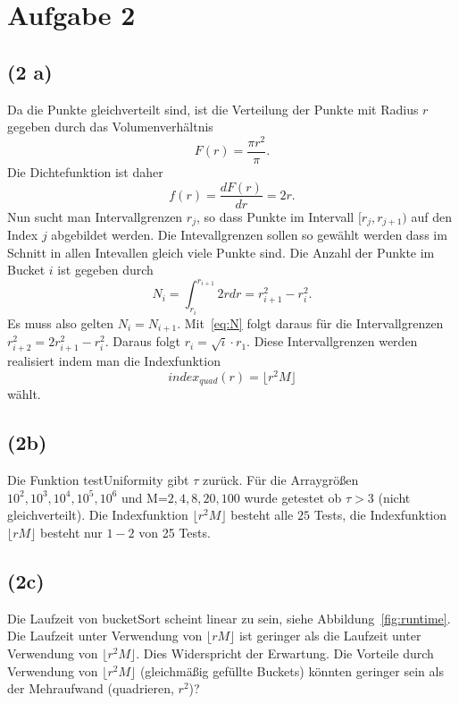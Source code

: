 \documentclass[a4paper]{article}
\begin{document}
\section*{Aufgabe 2}
\subsection*{(2 a)}
Da die Punkte gleichverteilt sind, ist die Verteilung der Punkte mit Radius $r$ gegeben durch das Volumenverhältnis 
\begin{equation}
F(r)=\frac{\pi r^2}{\pi}.
\end{equation}
Die Dichtefunktion ist daher
\begin{equation}
f(r)=\frac{dF(r)}{dr}=2r.
\end{equation}
Nun sucht man Intervallgrenzen $r_j$, so dass Punkte im Intervall $[r_j,r_{j+1})$ auf den Index $j$ abgebildet werden. Die Intevallgrenzen sollen so gewählt werden dass im Schnitt in allen Intevallen gleich viele Punkte sind.
Die Anzahl der Punkte im Bucket $i$ ist gegeben durch
\begin{equation}
N_i = \int_{r_i}^{r_{i+1}}2r dr = r_{i+1}^2-r_i^2.\label{eq:N}
\end{equation}
Es muss also gelten $N_i=N_{i+1}$. Mit~\eqref{eq:N} folgt daraus für die Intervallgrenzen $r_{i+2}^2=2r_{i+1}^2-r_i^2$. Daraus folgt $r_i=\sqrt{i}\cdot r_1$. Diese Intervallgrenzen werden realisiert indem man die Indexfunktion
\begin{equation}
index_{quad}(r)=\lfloor r^2M\rfloor
\end{equation}
wählt.

\subsection*{(2b)}
Die Funktion testUniformity gibt $\tau$ zurück. Für die Arraygrößen $10^2,10^3,10^4,10^5,10^6$ und M=$2,4,8,20,100$ wurde getestet ob $\tau>3$ (nicht gleichverteilt). Die Indexfunktion $\lfloor r^2M\rfloor$ besteht alle $25$ Tests, die Indexfunktion $\lfloor rM\rfloor$ besteht nur $1-2$ von 25 Tests.




\subsection*{(2c)}

Die Laufzeit von bucketSort scheint linear zu sein, siehe Abbildung~\ref{fig:runtime}. Die Laufzeit unter Verwendung von $\lfloor rM\rfloor$ ist geringer als die Laufzeit unter Verwendung von $\lfloor r^2M\rfloor$. Dies Widerspricht der Erwartung. Die Vorteile durch Verwendung von $\lfloor r^2M\rfloor$ (gleichmäßig gefüllte Buckets) könnten geringer sein als der Mehraufwand (quadrieren, $r^2$)?
\end{document}
